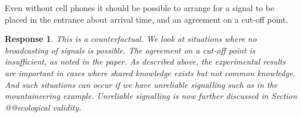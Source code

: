 \documentclass[a4paper]{article}
\newtheorem{response}{Response}
\begin{document}
Even without cell phones it should be possible to arrange for a signal to be placed in the entrance about arrival time, and an agreement on a cut-off point.

\begin{response} 
This is a counterfactual. We look at situations where no broadcasting of signals is possible. The agreement on a cut-off point is insufficient, as noted in the paper. As described above, the experimental results are important in cases where shared knowledge exists but not common knowledge. And such situations can occur if we have unreliable signalling such as in the mountaineering example. Unreliable signalling is now further discussed in Section @@ecological validity.





\end{response}
\end{document}
